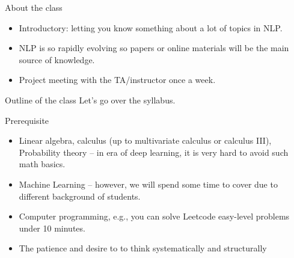\documentclass[11pt,handout]{beamer}
\begin{document}
\begin{frame}{About the class}
  \begin{itemize}
   \item Introductory: letting you know something about a lot of topics in NLP.
   \item NLP is so rapidly evolving so papers or online materials will be the main source of knowledge. 
   \item Project meeting with the TA/instructor once a week.  
  \end{itemize}
 \end{frame}

\begin{frame}{Outline of the class}
Let's go over the syllabus. 
\end{frame}

\begin{frame}{Prerequisite}
\begin{itemize}
\item Linear algebra, calculus (up to multivariate calculus or calculus III), Probability theory -- in era of deep learning, it is very hard to avoid such math basics.
\item Machine Learning -- however, we will spend some time to cover due to different background of students. 
\item Computer programming, e.g., you can solve Leetcode easy-level problems under 10 minutes. 
\item The patience and desire to to think systematically and structurally 
\end{itemize}
\end{frame}


\end{document}
